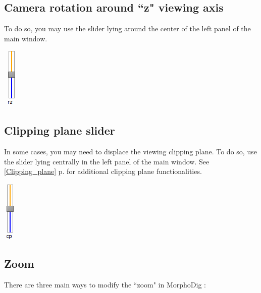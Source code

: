 \subsection{Camera rotation around ``z" viewing axis}

\begin{minipage}{0.7\textwidth}
To do so, you may use the slider lying around the center of the left panel of the main window.
\end{minipage}    
\begin{minipage}{0.25\textwidth}\centering
  \includegraphics[scale=0.7]{images/06/camera/rz_cam.png}
 \end{minipage}    



\subsection{Clipping plane slider}

\begin{minipage}{0.7\textwidth}
In some cases, you may need to displace the viewing clipping plane. To do so, use
the slider lying centrally in the left panel of the main window. See \ref{Clipping_plane} p.\pageref{Clipping_plane} for additional clipping plane functionalities.\\

\end{minipage}    
\begin{minipage}{0.25\textwidth}\centering
  \includegraphics[scale=0.5]{images/06/camera/cp_slider.png}
 \end{minipage}   




\subsection{Zoom}
There are three main ways to modify the ``zoom" in MorphoDig :


